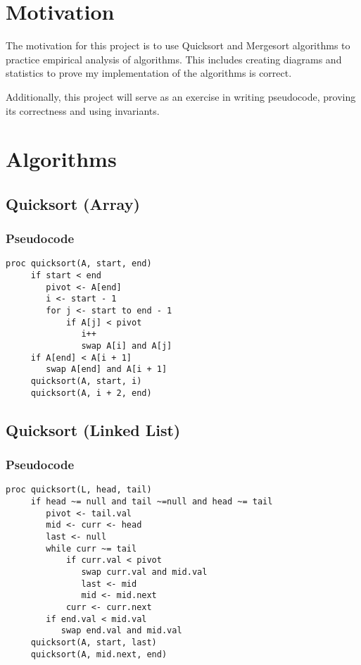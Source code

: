 \documentclass[a4paper,12pt]{article}
\begin{document}
\section{Motivation}

The motivation for this project is to use Quicksort and Mergesort algorithms to practice empirical analysis of algorithms.
This includes creating diagrams and statistics to prove my implementation of the algorithms is correct.

Additionally, this project will serve as an exercise in writing pseudocode, proving its correctness and using invariants.

\section{Algorithms}
\subsection{Quicksort (Array)}
\subsubsection{Pseudocode}
\begin{verbatim}
proc quicksort(A, start, end)
     if start < end
        pivot <- A[end]
        i <- start - 1 
        for j <- start to end - 1
            if A[j] < pivot
               i++
               swap A[i] and A[j]
     if A[end] < A[i + 1]
        swap A[end] and A[i + 1]
     quicksort(A, start, i)
     quicksort(A, i + 2, end)
\end{verbatim}
\subsection{Quicksort (Linked List)}
\subsubsection{Pseudocode}
\begin{verbatim}
proc quicksort(L, head, tail)
     if head ~= null and tail ~=null and head ~= tail
        pivot <- tail.val
        mid <- curr <- head
        last <- null
        while curr ~= tail
            if curr.val < pivot
               swap curr.val and mid.val
               last <- mid
               mid <- mid.next
            curr <- curr.next
        if end.val < mid.val
           swap end.val and mid.val
     quicksort(A, start, last)
     quicksort(A, mid.next, end)
\end{verbatim}
\end{document}
